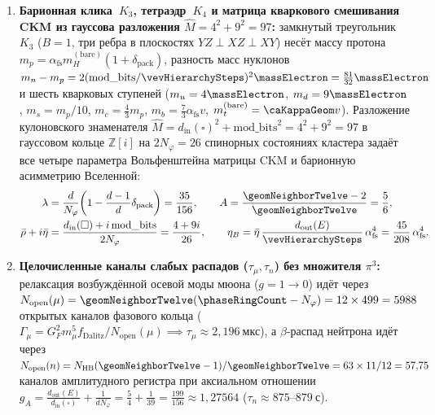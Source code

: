 \begin{theorem}
\begin{enumerate}[leftmargin=*]
  \begin{equation}
  \label{eq:floor2-pmns-exact-fractions}
  \begin{aligned}
    \sin^2\theta_{12}^{\mathrm{PMNS}} &= \frac{d_{\mathrm{same}}(V)}{N_\varphi} = \frac{4}{13},\qquad
    \sin^2\theta_{23}^{\mathrm{PMNS}} = \frac{d_{\mathrm{out}}(V)}{N_\varphi} = \frac{7}{13},\\
    \sin^2\theta_{13}^{\mathrm{PMNS}} &= \frac{1 + d_{\mathrm{in}}(V)}{N_{\mathrm{shell}}(3)} = \frac{2}{92} = \frac{1}{46}.
  \end{aligned}
  \end{equation}
\item \textbf{Барионная клика~$K_3$, тетраэдр~$K_4$ и матрица кваркового смешивания CKM из гауссова разложения $\hat M = 4^2+9^2 = 97$:}
  замкнутый треугольник~$K_3$ ($B=1$, три ребра в плоскостях $YZ\perp XZ\perp XY$) несёт массу протона $m_p = \alpha_{\mathrm{fs}} m_H^{(\mathrm{bare})}(1+\delta_{\mathrm{pack}})$, разность масс нуклонов $m_n - m_p = 2(\mathrm{mod\_bits}/\vevHierarchySteps)^2\massElectron = \frac{81}{32}\massElectron$ и шесть кварковых ступеней ($m_u=4\massElectron$, $m_d=9\massElectron$, $m_s=m_p/10$, $m_c=\frac{4}{3}m_p$, $m_b=\frac{7}{3}\alpha_{\mathrm{fs}}v$, $m_t^{(\mathrm{bare})}=\caKappaGeom v$).
  Разложение кулоновского знаменателя $\hat M = d_{\mathrm{in}}(\square)^2 + \mathrm{mod\_bits}^2 = 4^2 + 9^2 = 97$ в гауссовом кольце $\mathbb{Z}[i]$ на $2N_\varphi = 26$ спинорных состояниях кластера задаёт все четыре параметра Вольфенштейна матрицы CKM и барионную асимметрию Вселенной:
  \begin{equation}
  \label{eq:floor2-ckm-gaussian-97}
  \begin{aligned}
    \lambda &= \frac{d}{N_\varphi}\!\left(1 - \frac{d-1}{d}\delta_{\mathrm{pack}}\right) = \frac{35}{156},\qquad
    A = \frac{\geomNeighborTwelve - 2}{\geomNeighborTwelve} = \frac{5}{6},\\
    \bar\rho + i\bar\eta &= \frac{d_{\mathrm{in}}(\square) + i\,\mathrm{mod\_bits}}{2N_\varphi} = \frac{4 + 9i}{26},\qquad
    \eta_B = \bar\eta\,\frac{d_{\mathrm{out}}(E)}{\vevHierarchySteps}\,\alpha_{\mathrm{fs}}^4 = \frac{45}{208}\,\alpha_{\mathrm{fs}}^4.
  \end{aligned}
  \end{equation}
\item \textbf{Целочисленные каналы слабых распадов ($\tau_\mu,\tau_n$) без множителя $\pi^3$:}
  релаксация возбуждённой осевой моды мюона ($g=1\to 0$) идёт через $N_{\mathrm{open}}(\mu) = \geomNeighborTwelve(\phaseRingCount - N_\varphi) = 12\times 499 = 5988$ открытых каналов фазового кольца ($\Gamma_\mu = G_F^2 m_\mu^5 f_{\mathrm{Dalitz}}/N_{\mathrm{open}}(\mu) \implies \tau_\mu \approx 2{,}196\ \text{мкс}$), а $\beta$-распад нейтрона идёт через $N_{\mathrm{open}}(n) = N_{\mathrm{HB}}(\geomNeighborTwelve - 1)/\geomNeighborTwelve = 63\times 11/12 = 57{,}75$ каналов амплитудного регистра при аксиальном отношении $g_A = \frac{d_{\mathrm{out}}(E)}{d_{\mathrm{in}}(\square)} + \frac{1}{d N_\varphi} = \frac{5}{4} + \frac{1}{39} = \frac{199}{156} \approx 1{,}27564$ ($\tau_n \approx 875\text{--}879\ \text{с}$).

\end{enumerate}
\end{theorem}
